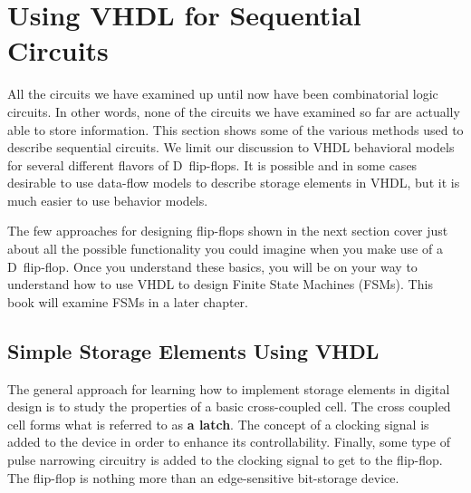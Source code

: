 %
%
\chapter{Using VHDL for Sequential Circuits}
All the circuits we have examined up until now have been combinatorial logic circuits. In other words, none of the circuits we have examined so far are actually able to store information. This section shows some of the various methods used to describe sequential circuits. We limit our discussion to VHDL behavioral models for several different flavors of D~flip-flops. It is possible and in some cases desirable to use data-flow models to describe storage elements in VHDL, but it is much easier to use behavior models.   

The few approaches for designing flip-flops shown in the next section cover just about all the possible functionality you could imagine when you make use of a D~flip-flop. Once you understand these basics, you will be on your way to understand how to use VHDL to design Finite State Machines (FSMs). This book will examine FSMs in a later chapter.

\section{Simple Storage Elements Using VHDL}
The general approach for learning how to implement storage elements in digital design is to study the properties of a basic cross-coupled cell. The cross coupled cell forms what is referred to as \textbf{a latch}. The concept of a clocking signal is added to the device in order to enhance its controllability. Finally, some type of pulse narrowing circuitry is added to the clocking signal to get to the flip-flop. The flip-flop is nothing more than an edge-sensitive bit-storage device.

